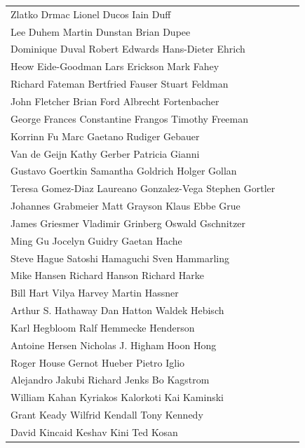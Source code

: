 \begin{tabular}{lll}
Zlatko Drmac           Lionel Ducos           Iain Duff\\
Lee Duhem              Martin Dunstan         Brian Dupee\\
Dominique Duval        Robert Edwards         Hans-Dieter Ehrich\\
Heow Eide-Goodman      Lars Erickson          Mark Fahey\\
Richard Fateman        Bertfried Fauser       Stuart Feldman\\
John Fletcher          Brian Ford             Albrecht Fortenbacher\\
George Frances         Constantine Frangos    Timothy Freeman\\
Korrinn Fu             Marc Gaetano           Rudiger Gebauer\\
Van de Geijn           Kathy Gerber           Patricia Gianni\\
Gustavo Goertkin       Samantha Goldrich      Holger Gollan\\
Teresa Gomez-Diaz      Laureano Gonzalez-Vega Stephen Gortler\\
Johannes Grabmeier     Matt Grayson           Klaus Ebbe Grue\\
James Griesmer         Vladimir Grinberg      Oswald Gschnitzer\\
Ming Gu                Jocelyn Guidry         Gaetan Hache\\
Steve Hague            Satoshi Hamaguchi      Sven Hammarling\\
Mike Hansen            Richard Hanson         Richard Harke\\
Bill Hart              Vilya Harvey           Martin Hassner\\
Arthur S. Hathaway     Dan Hatton             Waldek Hebisch\\
Karl Hegbloom          Ralf Hemmecke          Henderson\\
Antoine Hersen         Nicholas J. Higham     Hoon Hong\\
Roger House            Gernot Hueber          Pietro Iglio\\
Alejandro Jakubi       Richard Jenks          Bo Kagstrom\\
William Kahan          Kyriakos Kalorkoti     Kai Kaminski\\
Grant Keady            Wilfrid Kendall        Tony Kennedy\\
David Kincaid          Keshav Kini            Ted Kosan\\
\end{tabular}
